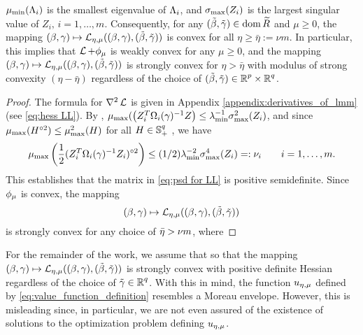 \begin{lemma}
\[\]
$\mu_{\text{min}}(\Lambda_i)$ is the smallest eigenvalue of $\Lambda_i$, and
 $\sigma_{\text{max}}(Z_i)$ is the largest singular value of $Z_i,\, i=1,\dots,m$.
Consequently, for any $(\tilde\beta,{\tilde{\gamma}})\in\operatorname{\mathrm{dom}}{{\widetilde R}}$ and $\mu\ge 0$, the mapping 
\(
(\beta,\gamma)\mapsto \operatorname{\mathcal{L}}_{{\eta,\mu}}((\beta,\gamma), (\tilde\beta,{\tilde{\gamma}}))
\)
is convex for all $\eta\ge\bar\eta:=\nu m$.
In particular, this implies that $\operatorname{\mathcal{L}}+\phi_\mu$ is weakly convex for any $\mu\ge 0$, 
and the mapping
\(
(\beta,\gamma)\mapsto\operatorname{\mathcal{L}}_{{\eta,\mu}}((\beta,\gamma),(\tilde\beta,{\tilde{\gamma}}))
\)
is strongly convex for $\eta> \bar\eta$ with modulus of strong convexity $(\eta-\bar\eta)$
regardless of the choice of $(\tilde\beta,{\tilde{\gamma}})\in{\operatorname{\mathbb{R}}^p}\times{\operatorname{\mathbb{R}}^q}$.
\end{lemma}
\begin{proof}
The formula for $\nabla^2\operatorname{\mathcal{L}}$ is given in Appendix \ref{appendix:derivatives_of_lmm}
(see \eqref{eq:hess LL}).
By \cite[Theorem 3.1]{ABBP2021}, 
$\mu_{\text{max}}(\left(Z_i^T\Omega_i(\gamma)^{-1}Z\right)\le
\lambda_{\text{min}}^{-1}\sigma_{\text{max}}^2(Z_i)$, and since 
$\mu_{\text{max}}(H^{\circ 2})\le \mu_{\text{max}}^2(H)$
for all $H\in\operatorname{\mathbb{S}}^q_+$ \cite{HJ85}, we have
\[
\mu_{\text{max}}\left(\frac{1}{2}(Z_i^T\Omega_i(\gamma)^{-1}Z_i)^{\circ2}\right)
\le (1/2) \lambda_{\text{min}}^{-2}
\sigma^4_{\text{max}}(Z_i)=:\nu_i
\qquad  i=1,\dots,m.
\]
This establishes that the matrix in \eqref{eq:psd for LL} is positive semidefinite.
Since $\phi_\mu$ is convex, the mapping
\[
(\beta,\gam)\mapsto \LL_{\emu}(\bg,\tbg) %
\]
is strongly convex for any choice
of ${\bar\eta}> \nu m$, where 
\end{proof}
For the remainder of the work, we assume that 
so that the mapping
$(\beta,\gamma)\mapsto \operatorname{\mathcal{L}}_{{\eta,\mu}}((\beta,\gamma),(\tilde\beta,{\tilde{\gamma}}))$ %
is strongly convex with 
positive definite Hessian
regardless of the 
choice of ${\tilde{\gamma}}\in\operatorname{\mathbb{R}}^q$. With this in mind, the function ${u_{\eta,\mu}}$ defined by
\eqref{eq:value_function_definition} resembles a Moreau envelope.
However, this is misleading since, in particular,
we are not even assured of the existence of solutions to
the optimization problem defining ${u_{\eta,\mu}}$. 

